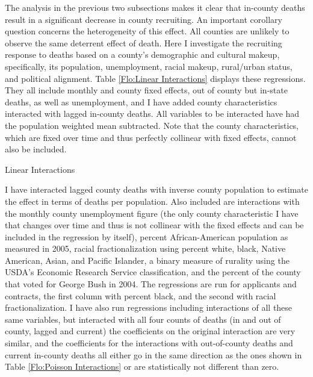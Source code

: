 \documentclass[12pt] {article}
\begin{document}
The analysis in the previous two subsections makes it clear that in-county
deaths result in a significant decrease in county recruiting. An important
corollary question concerns the heterogeneity of this effect.
All counties are unlikely to observe the same deterrent effect of
death. Here I investigate the recruiting response to deaths based
on a county's demographic and cultural makeup, specifically, its population,
unemployment, racial makeup, rural/urban status, and political alignment.
Table \ref{Flo:Linear Interactions} displays these regressions.
They all include monthly and county fixed effects, out of county but
in-state deaths, as well as unemployment, and I have added county
characteristics interacted with lagged in-county deaths. All variables
to be interacted have had the population weighted mean subtracted.%
Note that the county characteristics, which are fixed over time and thus perfectly collinear with fixed effects, cannot also be included.

\begin{table}
\caption{Linear Interactions}
\label{Flo:Linear Interactions}
\end{table}

I have interacted lagged county deaths with inverse county population to estimate the effect in terms of deaths per population. Also included are interactions with the monthly county unemployment figure (the only county characteristic I have
that changes over time and thus is not collinear with the fixed effects
and can be included in the regression by itself), percent African-American
population as measured in 2005, racial fractionalization using percent
white, black, Native American, Asian, and Pacific Islander, a binary
measure of rurality using the USDA's Economic Research Service classification,
and the percent of the county that voted for George Bush in 2004.
The regressions are run for applicants and contracts, the first column
with percent black, and the second with racial fractionalization.
I have also run regressions including interactions of all these same
variables, but interacted with all four counts of deaths (in and out
of county, lagged and current) the coefficients on the original interaction
are very similar, and the coefficients for the interactions with out-of-county
deaths and current in-county deaths all either go in the same direction
as the ones shown in Table \ref{Flo:Poisson Interactions} or are
statistically not different than zero. 
\end{document}
